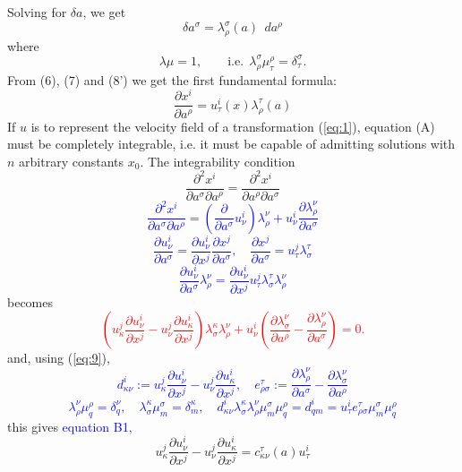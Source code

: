 Solving for \(\delta a\), we get
\[
\delta a^\sigma=\lambda_{\rho}^{\sigma} (a) ~~ d {a}^{\rho} \tag{8'}
\]
where
\begin{equation}\label{eq:9}
\lambda \mu=1, \qquad \text{i.e.}~~
\lambda_{\rho}^\sigma \mu_\tau^\rho=\delta_\tau^\sigma.
\end{equation}
From (6), (7) and (8') we get the first fundamental formula:
\[
\frac{\partial x^i}{\partial a^{\rho}} = u^i_{\tau}(x) \lambda^{\tau}_{\rho} (a) \tag{A}
\]
If \(u\) is to represent the velocity field of a transformation (\ref{eq:1}), equation
(A) must be completely integrable, i.e. it must be capable of admitting
solutions with \(n\) arbitrary constants \(x_0\). The integrability condition
\[
\frac{\partial^2 x^i}{\partial a^{\sigma} \partial a^{\rho}}=
\frac{\partial^2 x^i}{\partial a^{\rho} \partial a^{\sigma}}
\]
\textcolor{blue}{
\[
\frac{\partial^2 x^i}{\partial a^{\sigma} \partial a^{\rho}}=
\left( \frac{\partial}{\partial a^{\sigma}} u^i_{\nu} \right) \lambda^{\nu}_{\rho}+
u^i_{\nu} \frac{\partial \lambda^{\nu}_{\rho}}{\partial a^{\sigma}} 
\]
\[
\frac{\partial u^i_{\nu} }{\partial a^{\sigma}}  =
\frac{\partial u^i_{\nu} }{\partial x^{j}} 
\frac{\partial x^{j}}{\partial a^{\sigma}}, \quad
\frac{\partial x^j}{\partial a^{\sigma}} = 
u^j_{\tau} \lambda^{\tau}_{\sigma}
\]
\[
\frac{\partial u^i_{\nu} }{\partial a^{\sigma}} \lambda^{\nu}_{\rho}=
\frac{\partial u^i_{\nu} }{\partial x^{j}} 
u^j_{\tau} \lambda^{\tau}_{\sigma}
 \lambda^{\nu}_{\rho}
\]
}
becomes
\textcolor{red}{
\[
\left( u_{\kappa}^j \frac{\partial u^i_{\nu}}{\partial x^j}-
u^j_{\nu} \frac{\partial u_{\kappa}^i}{\partial x^j}\right)
\lambda_{\sigma}^{\kappa} \lambda^{\nu}_{\rho} +
u^i_{\nu} \left( \frac{\partial \lambda_\sigma^\nu}{\partial a^{\rho}}-
\frac{\partial \lambda_{\rho}^{\nu}}{\partial a^{\sigma}} \right)=0.
\]
}
and, using (\ref{eq:9}),
\textcolor{blue}{
\[
d_{\kappa \nu}^{i} := 
u_{\kappa}^j \frac{\partial u^i_{\nu}}{\partial x^j}-
u^j_{\nu} \frac{\partial u_{\kappa}^i}{\partial x^j}, \quad
e^{\tau}_{\rho  \sigma} := 
\frac{\partial \lambda_{\rho}^{\nu}}{\partial a^{\sigma}} -
 \frac{\partial \lambda_\sigma^\nu}{\partial a^{\rho}}
\]
\[
\lambda^{\nu}_{\rho} \mu^{\rho}_{q} =\delta^{\nu}_{q}, \quad
\lambda^{\kappa}_{\sigma} \mu^{\sigma}_{m} =\delta^{\kappa}_{m}, \quad
d_{\kappa \nu}^{i} \lambda_{\sigma}^{\kappa}
\lambda^{\nu}_{\rho} \mu^{\sigma}_{m} \mu^{\rho}_{q} = d_{q m}^{i} =
u^i_{\tau} e^{\tau}_{\rho  \sigma} \mu^{\sigma}_{m} \mu^{\rho}_{q} 
\]
}
this gives \textcolor{blue}{equation B1,}
\begin{equation}\label{eq:10}
u_{\kappa}^j \frac{\partial u^i_{\nu}}{\partial x^j}-
u^j_{\nu} \frac{\partial u_{\kappa}^i}{\partial x^j} =
c_{\kappa \nu}^{\tau}(a)  u_{\tau}^{i}
\end{equation}
